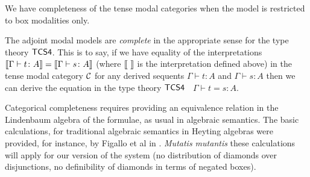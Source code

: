 We  have completeness of the tense modal categories when the model is restricted to box modalities only.

\begin{theorem}
\label{thm:tcs4-completeness}
The adjoint modal models are \textit{complete} in the appropriate
sense for the type theory $\sf{TCS4}$. This is to say, if we have
equality of the interpretations $\sem{\Gamma \vdash t \colon A} =
\sem{\Gamma \vdash s \colon A}$ (where \mbox{$\sem{\ } $} is the
interpretation defined above) in the tense modal category $\cal C$ for
any derived sequents $\Gamma \vdash t \colon A$ and $\Gamma \vdash s
\colon A$ then we can derive the equation in the type theory
$\sf{TCS4}$ $\;$ $\Gamma \vdash t = s \colon A$.
\end{theorem}
Categorical completeness requires providing an equivalence relation in
the Lindenbaum algebra of the formulae, as usual in algebraic
semantics. The basic calculations, for traditional algebraic semantics
in Heyting algebras were provided, for instance, by Figallo et al in
\cite{figallo2014}. \textit{Mutatis mutantis} these calculations will
apply for our version of the system (no distribution of diamonds over
disjunctions, no definibility of diamonds in terms of negated boxes).
